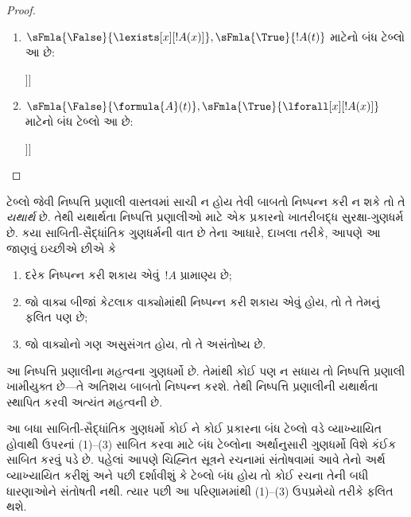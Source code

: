 \begin{proof}
\begin{enumerate}
\item $\sFmla{\False}{\lexists[x][!A(x)]},
  \sFmla{\True}{!A(t)}$ માટેનો બંધ ટેબ્લો આ છે:
  \begin{oltableau}
    [\sFmla{\False}{\lexists[x][\formula{A}(x)]}, just = \TAss
      [\sFmla{\True}{\formula{A}(t)}, just = \TAss
        [\sFmla{\False}{\formula{A}(t)}, just = {\TRule{\False}{\lexists}[1]}, close]]]
    \end{oltableau}
\item $\sFmla{\False}{\formula{A}(t)},
  \sFmla{\True}{\lforall[x][!A(x)]}$ માટેનો બંધ ટેબ્લો આ છે:
  \begin{oltableau}
    [\sFmla{\False}{\formula{A}(t)}, just = \TAss
      [\sFmla{\True}{\lforall[x][\formula{A}(x)]}, just = \TAss
        [\sFmla{\True}{\formula{A}(t)}, just = {\TRule{\True}{\lforall}[2]}, close]]]
    \end{oltableau}
\end{enumerate}
\end{proof}
\endgroup


\begingroup
\makeatletter{}\makeatother


\label{guunit:OLP-0109}


\begin{explain}
ટેબ્લો જેવી નિષ્પત્તિ પ્રણાલી વાસ્તવમાં સાચી ન હોય તેવી બાબતો
નિષ્પન્ન કરી ન શકે તો તે \emph{યથાર્થ} છે. તેથી યથાર્થતા
નિષ્પત્તિ પ્રણાલીઓ માટે એક પ્રકારનો ખાતરીબદ્ધ સુરક્ષા-ગુણધર્મ છે.
કયા સાબિતી-સૈદ્ધાંતિક ગુણધર્મની વાત છે તેના આધારે, દાખલા તરીકે, આપણે
આ જાણવું ઇચ્છીએ છીએ કે
\begin{enumerate}
\item દરેક નિષ્પન્ન કરી શકાય એવું~$!A$ પ્રામાણ્ય છે;
\item જો વાક્ય બીજાં કેટલાક વાક્યોમાંથી નિષ્પન્ન કરી શકાય એવું હોય, તો
  તે તેમનું ફલિત પણ છે;
\item જો વાક્યોનો ગણ અસુસંગત હોય, તો તે અસંતોષ્ય છે.
\end{enumerate}
આ નિષ્પત્તિ પ્રણાલીના મહત્વના ગુણધર્મો છે. તેમાંથી કોઈ પણ ન સધાય
તો નિષ્પત્તિ પ્રણાલી ખામીયુક્ત છે---તે અતિશય બાબતો નિષ્પન્ન કરશે.
તેથી નિષ્પત્તિ પ્રણાલીની યથાર્થતા સ્થાપિત કરવી અત્યંત મહત્વની છે.

આ બધા સાબિતી-સૈદ્ધાંતિક ગુણધર્મો કોઈ ને કોઈ પ્રકારના બંધ
ટેબ્લો વડે વ્યાખ્યાયિત હોવાથી ઉપરનાં (1)--(3) સાબિત કરવા માટે
બંધ ટેબ્લોના અર્થાનુસારી ગુણધર્મો વિશે કંઈક સાબિત કરવું પડે છે.
પહેલાં આપણે ચિહ્નિત સૂત્રને રચનામાં સંતોષવામાં આવે તેનો અર્થ
વ્યાખ્યાયિત કરીશું અને પછી દર્શાવીશું કે ટેબ્લો બંધ હોય તો કોઈ
રચના તેની બધી ધારણાઓને સંતોષતી નથી. ત્યાર પછી આ પરિણામમાંથી (1)--(3)
ઉપપ્રમેયો તરીકે ફલિત થશે.
\end{explain}

